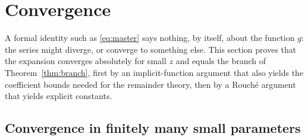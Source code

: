 \section{Convergence}
\label{sec:convergence}

A formal identity such as \eqref{eq:master} says nothing, by itself, about the function $g$: the series might diverge, or converge to something else. This section proves that the expansion converges absolutely for small $z$ and equals the branch of Theorem~\ref{thm:branch}, first by an implicit-function argument that also yields the coefficient bounds needed for the remainder theory, then by a Rouch\'e argument that yields explicit constants.

\subsection{Convergence in finitely many small parameters}

